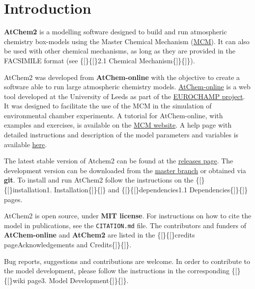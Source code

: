 \chapter{Introduction} \label{ch:introduction}

\textbf{AtChem2} is a modelling software designed to build and run
atmospheric chemistry box-models using the Master Chemical Mechanism
(\href{http://mcm.leeds.ac.uk/MCM/}{MCM}). It can also be used with
other chemical mechanisms, as long as they are provided in the
FACSIMILE format (see \{{[}\}\{{[}\}2.1 Chemical
Mechanism\{{]}\}\{{]}\}).

AtChem2 was developed from \textbf{AtChem-online} with the objective
to create a software able to run large atmospheric chemistry
models. \href{https://atchem.leeds.ac.uk/webapp/}{AtChem-online} is a
web tool developed at the University of Leeds as part of the
\href{https://www.eurochamp.org/}{EUROCHAMP project}. It was designed
to facilitate the use of the MCM in the simulation of environmental
chamber experiments. A tutorial for AtChem-online, with examples and
exercises, is available on the
\href{http://mcm.leeds.ac.uk/MCMv3.3.1/atchem/tutorial_intro.htt}{MCM
website}. A help page with detailed instructions and description of
the model parameters and variables is available
\href{https://atchem.leeds.ac.uk/webapp/run/help.html}{here}.

The latest stable version of Atchem2 can be found at the
\href{https://github.com/AtChem/AtChem2/releases}{releases page}. The
development version can be downloaded from the
\href{https://github.com/AtChem/AtChem2/archive/master.zip}{master
branch} or obtained via \textbf{git}. To install and run AtChem2
follow the instructions on the \{{[}\}\{{[}\}installation\textbar{}1.
Installation\{{]}\}\{{]}\} and \{{[}\}\{{[}\}dependencies\textbar{}1.1
Dependencies\{{]}\}\{{]}\} pages.

AtChem2 is open source, under \textbf{MIT license}. For instructions
on how to cite the model in publications, see the \texttt{CITATION.md}
file. The contributors and funders of \textbf{AtChem-online} and
\textbf{AtChem2} are listed in the \{{[}\}\{{[}\}credits
page\textbar{}Acknowledgements and Credits\{{]}\}\{{]}\}.

Bug reports, suggestions and contributions are welcome. In order to
contribute to the model development, please follow the instructions in
the corresponding \{{[}\}\{{[}\}wiki page\textbar{}3. Model
Development\{{]}\}\{{]}\}.
